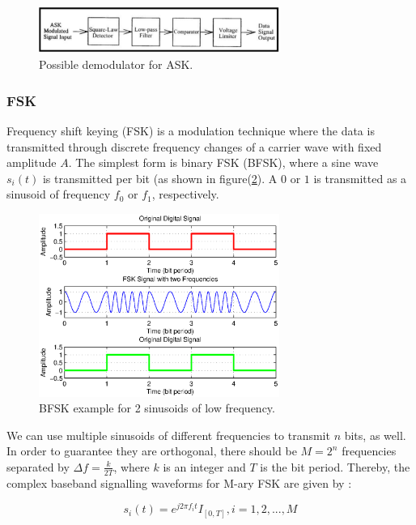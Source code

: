 \documentclass[12pt,a4paper,openright]{article}
\begin{document}
\begin{figure}[h]
  \centering
    \includegraphics[width=0.7\textwidth]{askdem.pdf}
    \caption{Possible demodulator for ASK\protect\cite{ASKDemGaza}.}
    \label{fig:askdem}
\end{figure}

\subsubsection{FSK}
\label{subsec:fsk}
Frequency shift keying (FSK) is a modulation technique where the data is transmitted through discrete frequency changes of a carrier wave with fixed amplitude $A$. The simplest form is binary FSK (BFSK), where a sine wave $s_i(t)$ is transmitted per bit (as shown in figure(\ref{fig:fskex}). A $0$ or $1$ is transmitted as a sinusoid of frequency $f_0$ or $f_1$, respectively. 

\begin{figure}[h]
  \centering
    \includegraphics[width=0.7\textwidth]{fskexample.eps}
    \caption{BFSK example for 2 sinusoids of low frequency.}
    \label{fig:fskex}
\end{figure}

We can use multiple sinusoids of different frequencies to transmit $n$ bits, as well. In order to guarantee they are orthogonal, there should be $M=2^n$ frequencies separated by $\Delta f=\frac{k}{2T}$, where $k$ is an integer and $T$ is the bit period. Thereby, the complex baseband signalling waveforms for M-ary FSK are given by \cite{Madhow}:

\[{s_i}(t) = {e^{j2\pi {f_i}t}}{I_{[0,T]}},i = 1,2,...,M\]
\end{document}
